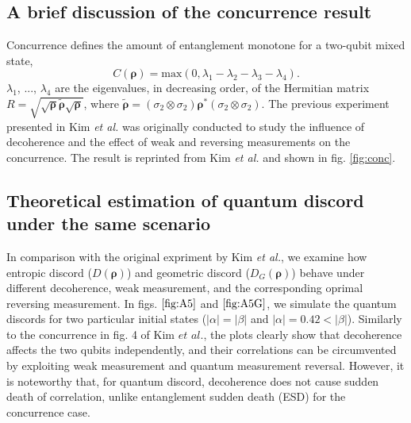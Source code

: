 \documentclass[%
 reprint,
 amsmath,amssymb,
 aps,
]{revtex4-1}
\begin{document}
\subsection{A brief discussion of the concurrence result}
\noindent Concurrence defines the amount of entanglement monotone for a two-qubit mixed state,
\begin{equation}
\textit{C}(\boldsymbol{\rho}) = \text{max}(0, \lambda_1-\lambda_2-\lambda_3-\lambda_4) \text{.}
\end{equation}
\noindent $\lambda_1$, ..., $\lambda_4$ are the eigenvalues, in decreasing order, of the Hermitian matrix $R=\sqrt{\sqrt{\boldsymbol{\rho}}\tilde{\boldsymbol{\rho}}\sqrt{\boldsymbol{\rho}}}$, where $\tilde{\boldsymbol{\rho}} = (\sigma_2 \otimes \sigma_2)\boldsymbol{\rho}^* (\sigma_2 \otimes \sigma_2)$. The previous experiment presented in Kim \textit{et al.} was originally conducted to study the influence of decoherence and the effect of weak and reversing measurements on the concurrence. The result is reprinted from Kim \textit{et al.} and shown in fig. \ref{fig:conc}.


\subsection{Theoretical estimation of quantum discord under the same scenario}
\noindent In comparison with the original expriment by Kim \textit{et al.}, we examine how entropic discord ($\textit{D}(\boldsymbol{\rho})$) and geometric discord ($\textit{D}_G(\boldsymbol{\rho})$) behave under different decoherence, weak measurement, and the corresponding oprimal reversing measurement. In figs. $\ref{fig:A5}$ and $\ref{fig:A5G}$, we simulate the quantum discords for two particular initial states ($|\alpha|=|\beta|$ and $|\alpha|=0.42<|\beta|$). Similarly to the concurrence in fig. 4 of Kim $\textit{et al.}$, the plots clearly show that decoherence affects the two qubits independently, and their correlations can be circumvented by exploiting weak measurement and quantum measurement reversal. However, it is noteworthy that, for quantum discord, decoherence does not cause sudden death of correlation, unlike entanglement sudden death (ESD) for the concurrence case.
\end{document}
